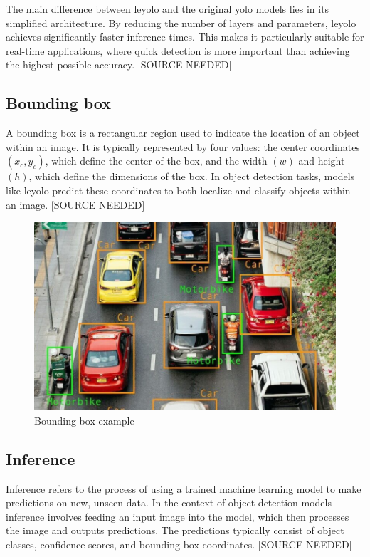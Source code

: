 The main difference between \gls{leyolo} and the original \gls{yolo} models lies in its simplified architecture. By reducing the number of layers and parameters, \gls{leyolo} achieves significantly faster inference times. This makes it particularly suitable for real-time applications, where quick detection is more important than achieving the highest possible accuracy. [SOURCE NEEDED]

\subsection{Bounding box}
A bounding box is a rectangular region used to indicate the location of an object within an image. It is typically represented by four values: the center coordinates \((x_c, y_c)\), which define the center of the box, and the width \((w)\) and height \((h)\), which define the dimensions of the box. In object detection tasks, models like \gls{leyolo} predict these coordinates to both localize and classify objects within an image. [SOURCE NEEDED]

\begin{figure}[h!]
    \centering
    \includegraphics[width=0.9\linewidth]{figures/theory/bbox-example.png}
    \caption[Bounding box example]{Bounding box example \cite{peopleforai:boundingbox}}
    \label{fig:classification}
\end{figure}


\subsection{Inference} 
Inference refers to the process of using a trained machine learning model to make predictions on new, unseen data. In the context of object detection models inference involves feeding an input image into the model, which then processes the image and outputs predictions. The predictions typically consist of object classes, confidence scores, and bounding box coordinates. [SOURCE NEEDED]






